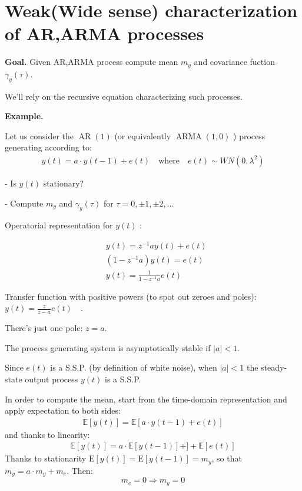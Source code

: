 
\section{Weak(Wide sense) characterization of AR,ARMA processes}
\textbf{Goal.} Given AR,ARMA process compute mean $m_y$ and covariance fuction $\gamma_y(\tau)$.


We'll rely on the recursive equation characterizing such processes.

\textbf{Example.}

Let us consider the $\operatorname{AR}(1)$ (or equivalently $\operatorname{ARMA}(1,0)$ ) process generating according to:
\begin{align*}
	y(t)=a \cdot y(t-1)+e(t) \quad \text{where} \quad e(t) \sim W N\left(0, \lambda^{2}\right)
\end{align*}

- Is $y(t)$ stationary?

- Compute $m_{y}$ and $\gamma_{y}(\tau)$ for $\tau=0, \pm 1, \pm 2, \ldots$

Operatorial representation for $y(t)$ :

\begin{align*}
	&y(t)=z^{-1} a y(t)+e(t) \\
	&\left(1-z^{-1} a\right) y(t)=e(t) \\
	&y(t)=\frac{1}{1-z^{-1} a} e(t)
\end{align*}

Transfer function with positive powers (to spot out zeroes and poles): $y(t)=\frac{z}{z-a} e(t) \quad$.

There's just one pole: $z=a .$

The process generating system is asymptotically stable if $|a| <1$. 

Since $e(t)$ is a S.S.P. (by definition of white noise), when $|a| <1$ the steady-state output process $y(t)$ is a S.S.P.

In order to compute the mean, start from the time-domain representation and apply expectation to 
both sides:
\begin{align*}
	\mathbb{E}[y(t)]=\mathbb{E}[a \cdot y(t-1)+e(t)]
\end{align*}
and thanks to linearity:
\begin{align*}
	\mathbb{E}[y(t)]=a \cdot \mathbb{E}[y(t-1)]+]+\mathbb{E}[e(t)]
\end{align*}
Thanks to stationarity $\mathrm{E}[y(t)]=\mathrm{E}[y(t-1)]=m_{y}$, so that $m_{y}=a \cdot m_{y}+m_{e}$.
Then:
$$
m_{e}=0 \Rightarrow m_{y}=0
$$

